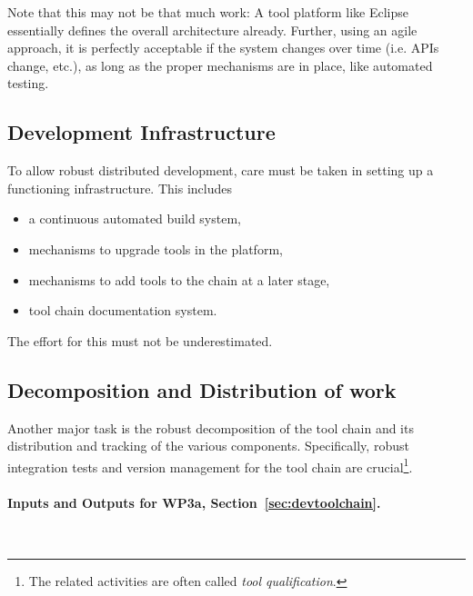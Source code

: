 \documentclass{template/openetcs_article}
\begin{document}
Note that this may not be that much work:  A tool platform like Eclipse essentially defines the overall architecture already.  Further, using an agile approach, it is perfectly acceptable if the system changes over time (i.e. APIs change, etc.), as long as the proper mechanisms are in place, like automated testing.

\subsection{Development Infrastructure}

To allow robust distributed development, care must be taken in setting up a functioning infrastructure.  This includes 
\begin{itemize}
\item a continuous automated build system, 
\item mechanisms to upgrade tools in the platform, 
\item mechanisms to add tools to the chain at a later stage,
\item tool chain documentation system. 
\end{itemize}
 The effort for this must not be underestimated.

\subsection{Decomposition and Distribution of work}

Another major task is the robust decomposition of the tool chain and its 
distribution and tracking of the various components.  
Specifically, robust integration tests and version management for the tool chain are crucial\footnote{The related activities are often called {\it tool qualification}.}.



\paragraph{Inputs and Outputs for WP3a, Section~\ref{sec:devtoolchain}.}{~}\newline
\end{document}
